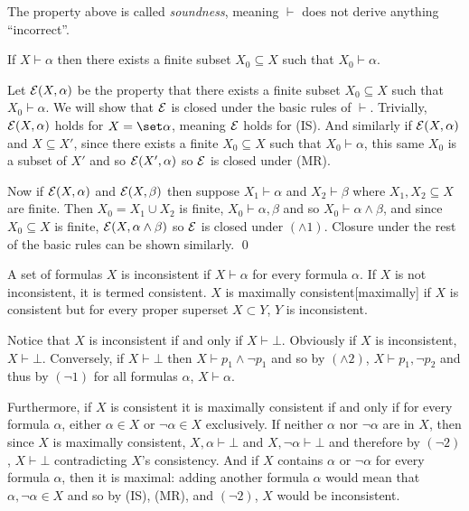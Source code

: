 The property above is called {\it soundness}, meaning $\vdash$ does not derive anything ``incorrect''.

\bthrm[name=vdashfinite]

    If $X\vdash\alpha$ then there exists a finite subset $X_0\subseteq X$ such that $X_0\vdash\alpha$.

\ethrm

Let ${\cal E}(X,\alpha)$ be the property that there exists a finite subset $X_0\subseteq X$ such that $X_0\vdash\alpha$.
We will show that ${\cal E}$ is closed under the basic rules of $\vdash$.
Trivially, ${\cal E}(X,\alpha)$ holds for $X=\set\alpha$, meaning ${\cal E}$ holds for (IS).
And similarly if ${\cal E}(X,\alpha)$ and $X\subseteq X'$, since there exists a finite $X_0\subseteq X$ such that $X_0\vdash\alpha$, this same $X_0$ is a subset of $X'$ and so ${\cal E}(X',\alpha)$ so
${\cal E}$ is closed under (MR).

Now if ${\cal E}(X,\alpha)$ and ${\cal E}(X,\beta)$ then suppose $X_1\vdash\alpha$ and $X_2\vdash\beta$ where $X_1,X_2\subseteq X$ are finite.
Then $X_0=X_1\cup X_2$ is finite, $X_0\vdash\alpha,\beta$ and so $X_0\vdash\alpha\land\beta$, and since $X_0\subseteq X$ is finite, ${\cal E}(X,\alpha\land\beta)$ so ${\cal E}$ is closed under $(\land1)$.
Closure under the rest of the basic rules can be shown similarly.
\qed

\bdefn

    A set of formulas $X$ is {\emphcolor inconsistent} if $X\vdash\alpha$ for every formula $\alpha$.
    If $X$ is not inconsistent, it is termed {\emphcolor consistent}.
    $X$ is {\emphcolor maximally consistent}[maximally] if $X$ is consistent but for every proper superset $X\subset Y$, $Y$ is inconsistent.

\edefn

Notice that $X$ is inconsistent if and only if $X\vdash\bot$.
Obviously if $X$ is inconsistent, $X\vdash\bot$.
Conversely, if $X\vdash\bot$ then $X\vdash p_1\land\neg p_1$ and so by $(\land2)$, $X\vdash p_1,\neg p_2$ and thus by $(\neg1)$ for all formulas $\alpha$, $X\vdash\alpha$.

Furthermore, if $X$ is consistent it is maximally consistent if and only if for every formula $\alpha$, either $\alpha\in X$ or $\neg\alpha\in X$ exclusively.
If neither $\alpha$ nor $\neg\alpha$ are in $X$, then since $X$ is maximally consistent, $X,\alpha\vdash\bot$ and $X,\neg\alpha\vdash\bot$ and therefore by $(\neg2)$, $X\vdash\bot$ contradicting $X$'s
consistency.
And if $X$ contains $\alpha$ or $\neg\alpha$ for every formula $\alpha$, then it is maximal: adding another formula $\alpha$ would mean that $\alpha,\neg\alpha\in X$ and so by (IS), (MR), and $(\neg2)$, $X$
would be inconsistent.

